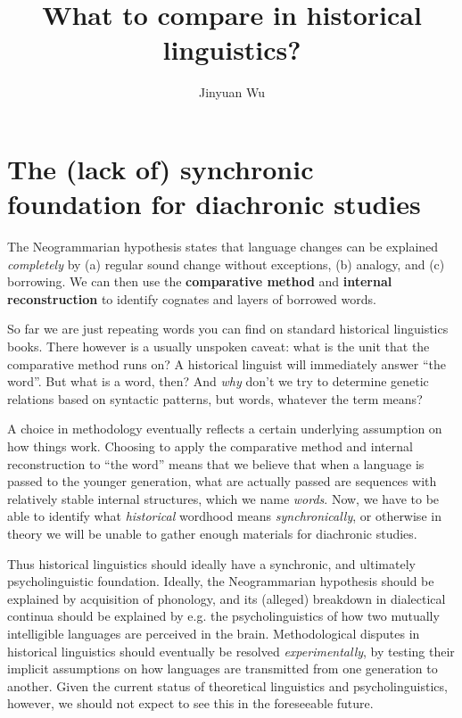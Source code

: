 \documentclass[a4paper, oneside, scheme=plain, 12pt]{article}
\title{What to compare in historical linguistics?}
\author{Jinyuan Wu}
\newcommand*{\concept}[1]{\textbf{#1}}
\newcommand*{\term}[1]{\emph{#1}}
\begin{document}
\automath

\maketitle

\section{The (lack of) synchronic foundation for diachronic studies}\label{sec:intro}

The Neogrammarian hypothesis states that language changes can be explained \emph{completely} by 
(a) regular sound change without exceptions,
(b) analogy, and (c) borrowing.
We can then use the \concept{comparative method} and \concept{internal reconstruction}
to identify cognates and layers of borrowed words.

So far we are just repeating words you can find on standard historical linguistics books.
There however is a usually unspoken caveat:
what is the unit that the comparative method runs on?
A historical linguist will immediately answer ``the word''.
But what is a word, then? And \emph{why} don't we try to determine genetic relations based on syntactic patterns, but words, whatever the term means?

A choice in methodology eventually reflects a certain underlying assumption on how things work.
Choosing to apply the comparative method and internal reconstruction to ``the word''
means that we believe that when a language is passed to the younger generation,
what are actually passed are sequences with relatively stable internal structures,
which we name \term{words}.
Now, we have to be able to identify what \emph{historical} wordhood means \emph{synchronically},
or otherwise in theory we will be unable to gather enough materials for diachronic studies.

Thus historical linguistics should ideally have a synchronic, and ultimately psycholinguistic foundation.
Ideally, the Neogrammarian hypothesis should be explained by acquisition of phonology,
and its (alleged) breakdown in dialectical continua should be explained by
e.g. the psycholinguistics of how two mutually intelligible languages are perceived in the brain.
Methodological disputes in historical linguistics should eventually be resolved \emph{experimentally},
by testing their implicit assumptions on how languages are transmitted from one generation to another.
Given the current status of theoretical linguistics and psycholinguistics,
however, we should not expect to see this in the foreseeable future.
\end{document}
